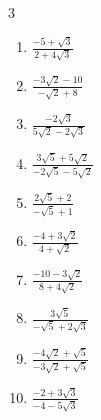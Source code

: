 \begin{multicols}{3}
\begin{enumerate}

  \item $\displaystyle \frac{-5+\sqrt{3}}{2+4\sqrt{3}}$


  \item $\displaystyle \frac{-3\sqrt{2}-10}{-\sqrt{2}+8}$


  \item $\displaystyle \frac{-2\sqrt{3}}{5\sqrt{2}-2\sqrt{3}}$


\columnbreak %

  \item $\displaystyle \frac{3\sqrt{5}+5\sqrt{2}}{-2\sqrt{5}-5\sqrt{2}}$


  \item $\displaystyle \frac{2\sqrt{5}+2}{-\sqrt{5}+1}$


  \item $\displaystyle \frac{-4+3\sqrt{2}}{4+\sqrt{2}}$


  \item $\displaystyle \frac{-10-3\sqrt{2}}{8+4\sqrt{2}}$


  \item $\displaystyle \frac{3\sqrt{5}}{-\sqrt{5}+2\sqrt{3}}$


\columnbreak %

  \item $\displaystyle \frac{-4\sqrt{2}+\sqrt{5}}{-3\sqrt{2}+\sqrt{5}}$


  \item $\displaystyle \frac{-2+3\sqrt{3}}{-4-5\sqrt{3}}$



\end{enumerate}
\end{multicols}
